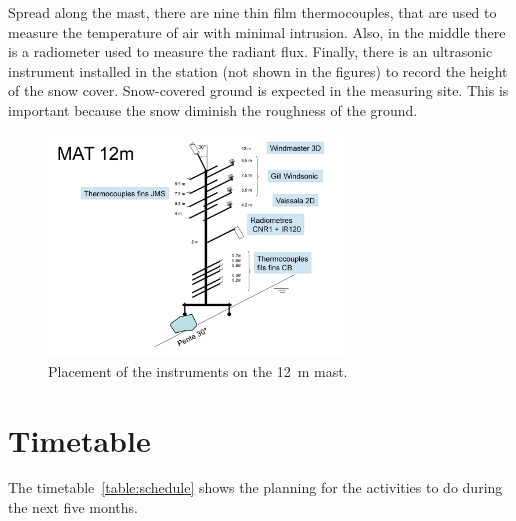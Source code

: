 \documentclass[a4paper,12pt]{article}
\begin{document}
Spread along the mast, there are nine thin film thermocouples, that are used to measure the temperature of air with minimal intrusion. Also, in the middle there is a radiometer used to measure the radiant flux. Finally, there is an ultrasonic instrument installed in the station (not shown in the figures) to record the height of the snow cover. Snow-covered ground is expected in the measuring site. This is important because the snow diminish the roughness of the ground.

\begin{figure}[!ht]
  \begin{center}
  \includegraphics[width=0.7\textwidth]{fig/0002.jpg}
  \caption{Placement of the instruments on the 12~m mast.}
  \label{fig:mast_12}
  \end{center}
\end{figure}


\section{Timetable}
The timetable~\ref{table:schedule} shows the planning for the activities to do during the next five months. 
\end{document}
